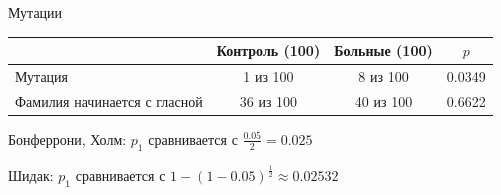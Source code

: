 \documentclass[9pt,pdf,utf8,hyperref={unicode},aspectratio=169]{beamer}
\begin{document}
\begin{frame}{Мутации}
    \begin{center}
    \begin{tabular}[t]{|m{3cm}|c|c|c|}
        \hline
                                     & Контроль (100) & Больные (100) & $p$ \\ \hline
        Мутация                      & 1 из 100       & 8 из 100      & 0.0349 \\\hline
        Фамилия начинается с гласной & 36 из 100      & 40 из 100     & 0.6622 \\\hline
    \end{tabular}
    \end{center}

    \bigskip

    Бонферрони, Холм: $p_1$ сравнивается с $\frac{0.05}{2}=0.025$

    Шидак: $p_1$ сравнивается с $1-\left(1-0.05\right)^{\frac1{2}}\approx0.02532$
\end{frame}
\end{document}
